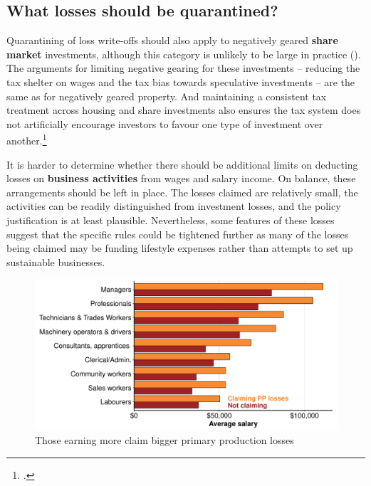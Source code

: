\subsection{What losses should be quarantined?}
Quarantining of loss write-offs should also apply to negatively geared \textbf{share market} investments, although this category is unlikely to be large in practice (). The arguments for limiting negative gearing for these investments – reducing the tax shelter on wages and the tax bias towards speculative investments – are the same as for negatively geared property. And maintaining a consistent tax treatment across housing and share investments also ensures the tax system does not artificially encourage investors to favour one type of investment over another.\footcite[][133]{Commission2004a}  

It is harder to determine whether there should be additional limits on deducting losses on \textbf{business activities} from wages and salary income.  On balance, these arrangements should be left in place. The losses claimed are relatively small, the activities can be readily distinguished from investment losses, and the policy justification is at least plausible. Nevertheless, some features of these losses suggest that the specific rules could be tightened further as many of the losses being claimed may be funding lifestyle expenses rather than attempts to set up sustainable businesses. 

\begin{figure}[t]
\caption{Those earning more claim bigger primary production losses\label{fig:PP-losses-by-salary}}
\includegraphics[width=1.27273\columnwidth, right]{CGT-NG-atlas/PP-losers-salary-comparison-horiz-bar-1.pdf}
\end{figure}

